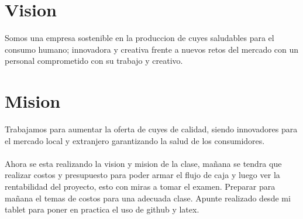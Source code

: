 \documentclass[11pt]{article}
\begin{document}
\section{Vision}
Somos una empresa sostenible en la produccion de cuyes saludables para el consumo humano; innovadora y creativa frente a nuevos retos del mercado con un personal comprometido con su trabajo y creativo.
\section{Mision}
Trabajamos para aumentar la oferta de cuyes de calidad, siendo innovadores para el mercado local y extranjero garantizando la salud de los consumidores.\\
\\
Ahora se esta realizando la vision y mision de la clase, mañana se tendra que realizar costos y presupuesto para poder armar el flujo de caja y luego ver la rentabilidad del proyecto, esto con miras a tomar el examen. Preparar para mañana el temas de costos para una adecuada clase. Apunte realizado desde mi tablet para poner en practica el uso de github y latex.
\end{document}
